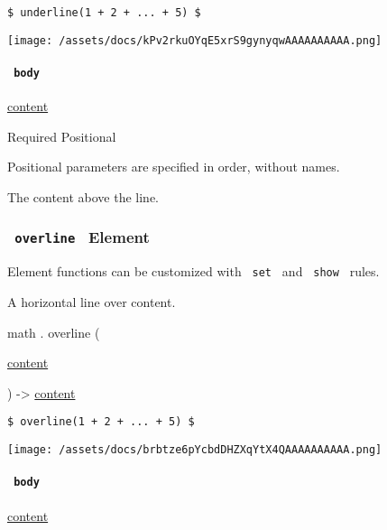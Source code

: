 \begin{verbatim}
$ underline(1 + 2 + ... + 5) $
\end{verbatim}

\texttt{[image: /assets/docs/kPv2rkuOYqE5xrS9gynyqwAAAAAAAAAA.png]}

\paragraph{\texorpdfstring{\texttt{\ body\ }}{ body }}\label{functions-underline-body}

\href{/docs/reference/foundations/content/}{content}

{Required} {{ Positional }}

\label{functions-underline-body-positional-tooltip}
Positional parameters are specified in order, without names.

The content above the line.

\subsubsection{\texorpdfstring{\texttt{\ overline\ } {{ Element
}}}{ overline   Element }}\label{functions-overline}

\label{functions-overline-element-tooltip}
Element functions can be customized with \texttt{\ set\ } and
\texttt{\ show\ } rules.

A horizontal line over content.

math { . } { overline } (

{ \href{/docs/reference/foundations/content/}{content} }

) -\textgreater{} \href{/docs/reference/foundations/content/}{content}

\begin{verbatim}
$ overline(1 + 2 + ... + 5) $
\end{verbatim}

\texttt{[image: /assets/docs/brbtze6pYcbdDHZXqYtX4QAAAAAAAAAA.png]}

\paragraph{\texorpdfstring{\texttt{\ body\ }}{ body }}\label{functions-overline-body}

\href{/docs/reference/foundations/content/}{content}

